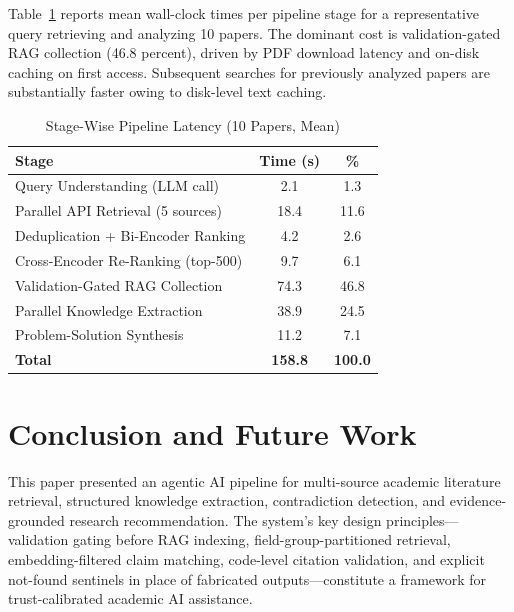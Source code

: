 \documentclass[conference]{IEEEtran}
\begin{document}
Table~\ref{tab:latency} reports mean wall-clock times per pipeline stage
for a representative query retrieving and analyzing 10 papers. The dominant
cost is validation-gated RAG collection (46.8 percent), driven by PDF
download latency and on-disk caching on first access. Subsequent searches
for previously analyzed papers are substantially faster owing to disk-level
text caching.

\begin{table}[htbp]
\caption{Stage-Wise Pipeline Latency (10 Papers, Mean)}
\label{tab:latency}
\begin{center}
\begin{tabular}{|l|c|c|}
\hline
\textbf{Stage} & \textbf{Time (s)} & \textbf{\%} \\
\hline
Query Understanding (LLM call)      &  2.1 &  1.3 \\
Parallel API Retrieval (5 sources)  & 18.4 & 11.6 \\
Deduplication + Bi-Encoder Ranking  &  4.2 &  2.6 \\
Cross-Encoder Re-Ranking (top-500)  &  9.7 &  6.1 \\
Validation-Gated RAG Collection     & 74.3 & 46.8 \\
Parallel Knowledge Extraction       & 38.9 & 24.5 \\
Problem-Solution Synthesis          & 11.2 &  7.1 \\
\hline
\textbf{Total}                      & \textbf{158.8} & \textbf{100.0} \\
\hline
\end{tabular}
\end{center}
\end{table}

\section{Conclusion and Future Work}
\label{sec:conclusion}

This paper presented an agentic AI pipeline for multi-source academic
literature retrieval, structured knowledge extraction, contradiction
detection, and evidence-grounded research recommendation. The system's key
design principles---validation gating before RAG indexing,
field-group-partitioned retrieval, embedding-filtered claim matching,
code-level citation validation, and explicit not-found sentinels in place
of fabricated outputs---constitute a framework for trust-calibrated academic
AI assistance.
\end{document}

